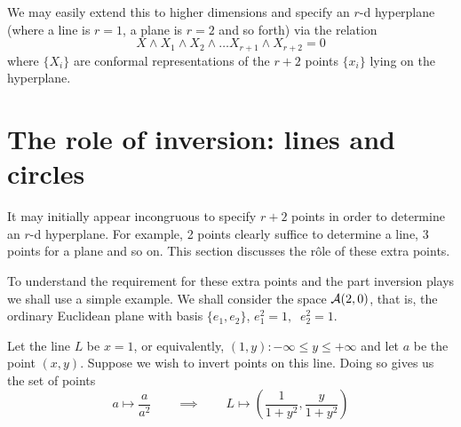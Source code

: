 We may easily extend this to higher dimensions and specify an $r$-d 
hyperplane (where a line is $r=1$, a plane is $r=2$ and so forth) via
the relation
%
\begin{equation}
  X\wedge X_1 \wedge X_2 \wedge \ldots  X_{r+1} \wedge X_{r+2} = 0
     \end{equation}
%
where $\{X_i\}$ are conformal representations
of the $r+2$ points $\{x_i\}$ lying on the hyperplane.

\section{The role of inversion: lines and circles}

It may initially appear incongruous to specify $r+2$ points in order to
determine an $r$-d hyperplane. For example, 2 points clearly suffice to
determine a line, 3 points for a plane and so on. This section discusses the
r\^ole of these extra points.

To understand the requirement for these extra points and the part inversion
plays we shall use a simple example. We shall consider the space
${\mathcal{A}}(2,0)$, that is, the ordinary Euclidean plane with basis $\{e_1,e_2\}$,
$e_1^2=1,\;\; e_2^2=1$.

Let the line $L$ be $x=1$, or equivalently, $(1,y) : -\infty \le y \le
+\infty$ and let $a$ be the point $(x,y)$. Suppose we wish to invert
points on this line. Doing so gives us the set of points
%
\begin{equation}
a \mapsto \frac{a}{a^2} \qquad \implies \qquad L \mapsto
\left( \frac{1}{1+y^2}, \frac{y}{1+y^2}\right)
\end{equation}

